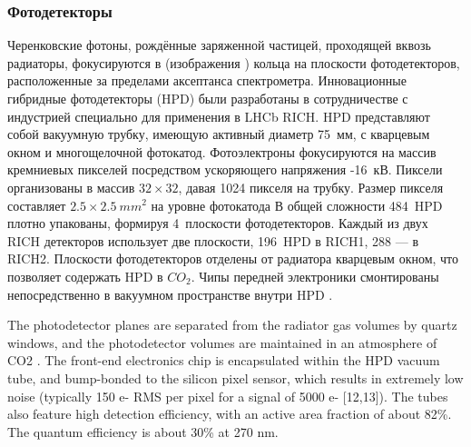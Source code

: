 \subsubsection{Фотодетекторы}

Черенковские фотоны, рождённые заряженной частицей, проходящей вквозь радиаторы, фокусируются в (изображения \todo) кольца на плоскости фотодетекторов, расположенные за пределами аксептанса спектрометра. Инновационные гибридные фотодетекторы (HPD) были разработаны в сотрудничестве с индустрией специально для применения в LHCb RICH. HPD представляют собой вакуумную трубку, имеющую активный диаметр 75~мм, с кварцевым окном и многощелочной фотокатод. Фотоэлектроны фокусируются на массив кремниевых пикселей посредством ускоряющего напряжения -16~кВ. Пиксели организованы в массив $32 \times 32$, давая 1024 пикселя на трубку. Размер пикселя составляет $2.5 \times 2.5~mm^{2}$ на уровне фотокатода \todo В общей сложности 484~HPD плотно упакованы, формируя 4~плоскости фотодетекторов. Каждый из двух RICH детекторов использует две плоскости, 196~HPD в RICH1, 288 --- в RICH2.
Плоскости фотодетекторов отделены от радиатора кварцевым окном, что позволяет содержать HPD в $CO_{2}$. Чипы передней электроники смонтированы непосредственно в вакуумном пространстве внутри HPD \todo.

The photodetector planes are separated from the radiator gas volumes by quartz windows, and the photodetector volumes are maintained in an atmosphere of CO2 . The front-end electronics chip is encapsulated within the HPD vacuum tube, and bump-bonded to the silicon pixel sensor, which results in extremely low noise (typically 150 e- RMS per pixel for a signal of 5000 e- [12,13]). The tubes also feature high detection efficiency, with an active area fraction of about 82\%. The quantum efficiency is about 30\% at 270 nm.

